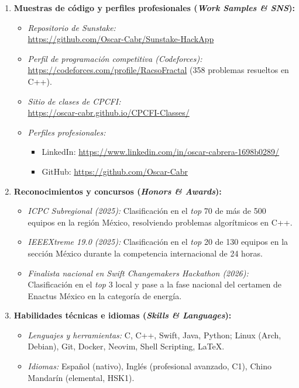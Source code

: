 \documentclass[12pt]{article}
\begin{document}
\begin{enumerate}[leftmargin=0.25in, itemsep=0.35em]
    \item \textbf{Muestras de código y perfiles profesionales (\textit{Work Samples \& SNS}):}
    \begin{itemize}[leftmargin=0.15in, noitemsep]
        \item \textit{Repositorio de Sunstake:}\\ {\footnotesize\url{https://github.com/Oscar-Cabr/Sunstake-HackApp}}
        \item \textit{Perfil de programación competitiva (Codeforces):}\\ {\footnotesize\url{https://codeforces.com/profile/RacsoFractal}} (358 problemas resueltos en C++).
        \item \textit{Sitio de clases de CPCFI:}\\ {\footnotesize\url{https://oscar-cabr.github.io/CPCFI-Classes/}}
        \item \textit{Perfiles profesionales:}
        \begin{itemize}[leftmargin=0.15in, noitemsep]
            \item LinkedIn: {\footnotesize\url{https://www.linkedin.com/in/oscar-cabrera-1698b0289/}}
            \item GitHub: {\footnotesize\url{https://github.com/Oscar-Cabr}}
        \end{itemize}
    \end{itemize}

    \item \textbf{Reconocimientos y concursos (\textit{Honors \& Awards}):}
    \begin{itemize}[leftmargin=0.15in, noitemsep]
        \item \textit{ICPC Subregional (2025):} Clasificación en el \textit{top} 70 de más de 500 equipos en la región México, resolviendo problemas algorítmicos en C++.
        \item \textit{IEEEXtreme 19.0 (2025):} Clasificación en el \textit{top} 20 de 130 equipos en la sección México durante la competencia internacional de 24 horas.
        \item \textit{Finalista nacional en Swift Changemakers Hackathon (2026):} Clasificación en el \textit{top} 3 local y pase a la fase nacional del certamen de Enactus México en la categoría de energía.
    \end{itemize}

    \item \textbf{Habilidades técnicas e idiomas (\textit{Skills \& Languages}):}
    \begin{itemize}[leftmargin=0.15in, noitemsep]
        \item \textit{Lenguajes y herramientas:} C, C++, Swift, Java, Python; Linux (Arch, Debian), Git, Docker, Neovim, Shell Scripting, LaTeX.
        \item \textit{Idiomas:} Español (nativo), Inglés (profesional avanzado, C1), Chino Mandarín (elemental, HSK1).
    \end{itemize}


\end{enumerate}
\end{document}
